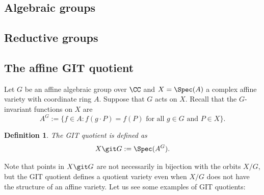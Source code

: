 \documentclass[12pt]{amsart}
\theoremstyle{plain}
\newtheorem{definition}[theorem]{Definition}
\begin{document}
\subsection{Algebraic groups}





\subsection{Reductive groups}





\subsection{The affine GIT quotient}
Let $G$ be an affine algebraic group over $\CC$ and $X = \Spec(A)$ a complex affine variety with coordinate ring $A$.
Suppose that $G$ acts on $X$.
Recall that the $G$-invariant functions on $X$ are
$$A^G := \{f \in A : f(g \cdot P) = f(P) \text{ for all } g \in G \text{ and } P \in X\}.$$

\begin{definition}
The GIT quotient is defined as
$$X \git G := \Spec(A^G).$$
\end{definition}

Note that points in $X \git G$ are not necessarily in bijection with the orbits $X / G$, but the GIT quotient defines a quotient variety even when $X / G$ does not have the structure of an affine variety.
Let us see some examples of GIT quotients:
\end{document}
